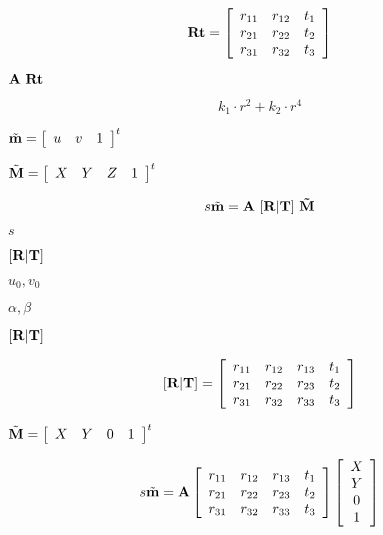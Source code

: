 \documentclass{article}
\begin{document}
{{{\[ \bf{Rt} = \left[ \begin{array}{ccc} r_{11} & r_{12} & t_1\\ r_{21} & r_{22} & t_2\\ r_{31} & r_{32} & t_3 \end{array}\right] \]
\pagebreak

$\bf{A}\ \bf{Rt}$
\pagebreak

\[ k_1 \cdot r^2+k_2 \cdot r^4 \]
\pagebreak

$ \tilde{\bf{m}} = \left[ \begin{array}{ccc} u & v & 1 \end{array} \right]^t $
\pagebreak

$ \tilde{\bf{M}} = \left[ \begin{array}{cccc} X& Y& Z& 1 \end{array} \right]^t $
\pagebreak

\[ s\tilde{\bf{m}} = \bf{A}\ [\bf{R}|\bf{T}]\ \tilde{\bf{M}} \]
\pagebreak

$s$
\pagebreak

$[\bf{R}|\bf{T}]$
\pagebreak

$u_0, v_0$
\pagebreak

$\alpha, \beta$
\pagebreak

$[\bf{R} | \bf{T}]$
\pagebreak

\[ \left[ \bf{R} | \bf{T} \right] = \left[ \begin{array}{cccc} r_{11} & r_{12} & r_{13} & t_1\\ r_{21} & r_{22} & r_{23} & t_2\\ r_{31} & r_{32} & r_{33} & t_3 \end{array} \right] \]
\pagebreak

$ \tilde{\bf{M}} = \left[ \begin{array}{cccc} X & Y & 0 & 1 \end{array} \right]^t $
\pagebreak

\[ s\tilde{\bf{m}} = \bf{A} \left[ \begin{array}{cccc} r_{11} & r_{12} & r_{13} & t_1 \\ r_{21} & r_{22} & r_{23} & t_2 \\ r_{31} & r_{32} & r_{33} & t_3 \end{array} \right] \left[ \begin{array}{c} X\\ Y\\ 0\\ 1 \end{array} \right] \]
\pagebreak

}}}
\end{document}
